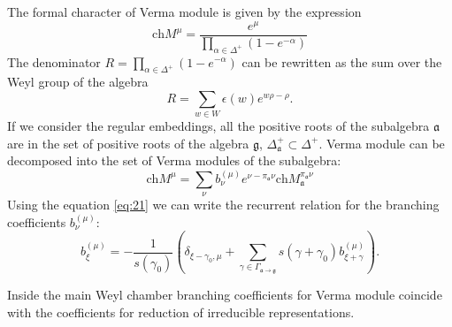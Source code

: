 \documentclass[12pt]{article}
\theoremstyle{definition}
\newcommand{\gf}{\mathfrak{g}}
\newcommand{\af}{\mathfrak{a}}
\begin{document}
The formal character of Verma module is given by the expression
\begin{equation}
  \label{eq:17}
  \mathrm{ch} M^{\mu}=\frac{e^{\mu}}{\prod_{\alpha\in \Delta^{+}} \left(1-e^{-\alpha}\right)}
\end{equation}
The denominator $R=\prod_{\alpha\in \Delta^{+}} \left(1-e^{-\alpha}\right)$ can be rewritten as the sum over the Weyl group of the algebra
\begin{equation}
  \label{eq:20}
  R=\sum_{w\in W} \epsilon(w) e^{w\rho-\rho}.
\end{equation}
If we consider the regular embeddings, all the positive roots of the subalgebra $\af$ are in the set of positive roots of the algebra $\gf$, $\Delta^{+}_{\af}\subset \Delta^{+}$. Verma module can be decomposed into the set of Verma modules of the subalgebra:
\begin{equation}
  \label{eq:18}
  \mathrm{ch}M^{\mu}=\sum_{\nu}b^{(\mu)}_{\nu} e^{\nu-\pi_{\af}\nu} \mathrm{ch}M^{\pi_{\af}\nu}_{\af}
\end{equation}
Using the equation \eqref{eq:21} we can write the recurrent relation for the branching coefficients $b^{(\mu)}_{\nu}$:
\begin{equation}
  \label{eq:19}
   b_{\xi }^{\left( \mu \right) }=-\frac{1}{s\left( \gamma _{0}\right) }\left(
        \delta_{\xi-\gamma_0,\mu}
        +\sum_{\gamma \in
          \Gamma _{\af \rightarrow \gf}}s\left( \gamma +\gamma _{0}\right) b_{\xi
          +\gamma }^{\left( \mu \right) }\right).
\end{equation}

Inside the main Weyl chamber branching coefficients for Verma module coincide with the coefficients
for reduction of irreducible representations.
\end{document}
